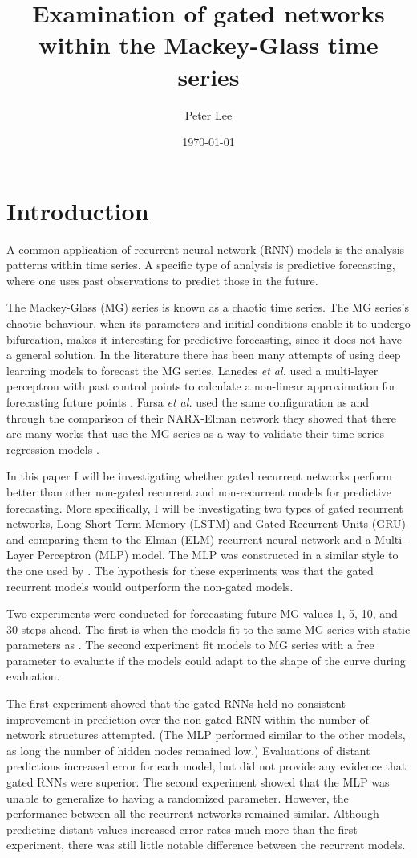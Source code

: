 \documentclass[11pt]{article}
\author{Peter Lee}
\date{\today}
\title{Examination of gated networks within the Mackey-Glass time series}
\begin{document}
\maketitle

\section{Introduction}
A common application of recurrent neural network (RNN) models is the
analysis patterns within time series. A specific
type of analysis is predictive forecasting, where one uses past
observations to predict those in the future. 

The Mackey-Glass (MG) series \cite{MG} is known as a chaotic time series.
The MG series's chaotic behaviour, when its parameters and initial
conditions enable it to undergo bifurcation, makes it interesting
for predictive forecasting, since it does not have a general
solution. In the literature there has been many attempts of using deep
learning models to forecast the MG
series. Lanedes \textit{et al.} used a multi-layer perceptron with past control
points to calculate a non-linear approximation for forecasting future
points \cite{tr}. Farsa \textit{et al.} used the same configuration as
\cite{tr} and through the comparison of their NARX-Elman network they showed
that there are many works that use the MG series as a way to validate
their time series regression models \cite{Farsa}.

In this paper I will be investigating whether gated recurrent networks
perform better than other non-gated recurrent and non-recurrent models for predictive
forecasting. More specifically, I will be investigating two types of
gated recurrent networks, Long Short Term Memory (LSTM) \cite{LSTM}
and Gated Recurrent Units (GRU) \cite{GRU} and comparing them to the Elman (ELM) recurrent neural network and a Multi-Layer Perceptron (MLP) model. The MLP was constructed in a similar style to the one used by \cite{tr}. The hypothesis for these experiments was that the gated recurrent models would outperform the non-gated models.

Two experiments were conducted for forecasting future MG values 1, 5,
10, and 30 steps ahead. The first is when the models fit to the same MG series with static parameters as \cite{tr,Farsa}. The second experiment fit models to MG series with
a free parameter to evaluate if the models could adapt to the shape of
the curve during evaluation. 

The first experiment showed that the gated RNNs held no consistent improvement in prediction over
the non-gated RNN within the number of network structures attempted. (The
MLP performed similar to the other models, as long the number of hidden nodes
remained low.) Evaluations of distant predictions increased
error for each model, but did not provide any evidence that gated RNNs were superior. The second experiment showed that the MLP was unable to generalize to
having a randomized parameter. However, the performance between all the
recurrent networks remained similar. Although predicting distant
values increased error rates much more than the first experiment,
there was still little notable difference between the recurrent
models.
\end{document}

